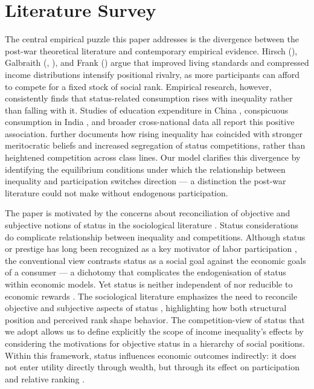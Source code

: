 \documentclass[
    oneside,
    fontsize=10pt,leqno]{article}
\begin{document}
\section{\label{sec:Literature-Survey-1}Literature Survey}

\noindent

The central empirical puzzle this paper addresses is the divergence
between the post-war theoretical literature and contemporary empirical
evidence. Hirsch (\citeyear{HirschSocialLimits}), Galbraith
(\citeyear{GalbraithAffluent}, \citeyear{GalbraithBeyondContentment1994}),
and Frank (\citeyear{FrankPond}) argue that improved living standards
and compressed income distributions intensify positional rivalry, as
more participants can afford to compete for a fixed stock of social
rank. Empirical research, however, consistently finds that status-related
consumption rises with inequality rather than falling with it. Studies
of education expenditure in China \citep{JinLiWu2011}, conspicuous
consumption in India \citep{JaikumarSarin2015}, and broader cross-national
data \citep{ChaiKausKiedaisch2019} all report this positive association.
\citet{MijsParadox2019} further documents how rising inequality has
coincided with stronger meritocratic beliefs and increased segregation
of status competitions, rather than heightened competition across
class lines. Our model clarifies this divergence by identifying the
equilibrium conditions under which the relationship between inequality
and participation switches direction --- a distinction the post-war
literature could not make without endogenous participation.

The paper is motivated by the concerns about reconciliation of objective and subjective notions of status in the sociological literature \citep{wegener1992prestigeconcepts}. Status considerations do complicate relationship between inequality and competitions. Although
status or prestige has long been recognized as a key motivator of
labor participation \citep{BenabouTiroleIntrinsicExtrinsic2003,FrankPond},
the conventional view contrasts status as a social goal against the
economic goals of a consumer --- a dichotomy that complicates the
endogenisation of status within economic models. Yet status is neither
independent of nor reducible to economic rewards
\citep{goode1978celebrationheroes,moldovanuselacontestsstatus2007}.
The sociological literature emphasizes the need to reconcile objective
and subjective aspects of status \citep{wegener1992prestigeconcepts},
highlighting how both structural position and perceived rank shape
behavior. The competition-view of status that we adopt allows us
to define explicitly the scope of income inequality's effects by
considering the motivations for objective status in a hierarchy of
social positions. Within this framework, status influences economic
outcomes indirectly: it does not enter utility directly through wealth,
but through its effect on participation and relative ranking
\citep{postlewaite1998socialbasisinterdeppreferences}.
\end{document}
